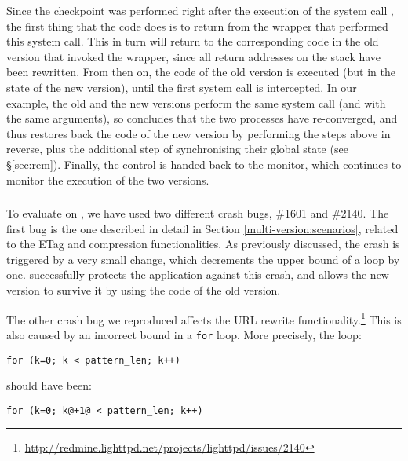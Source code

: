 Since the checkpoint was performed right after the execution of the system
call , the first thing that the code does is to
return from the  wrapper that performed this system
call.  This in turn will return to the corresponding code in the old
version that invoked the wrapper, since all return addresses on the
stack have been rewritten.  From then on, the code of the old version
is executed (but in the state of the new version), until the first
system call is intercepted.  In our example, the old and the new
versions perform the same system call (and with the same arguments),
so \rem concludes that the two processes have re-converged, and thus
restores back the code of the new version by performing the steps
above in reverse, plus the additional step of synchronising their
global state (see \S\ref{sec:rem}).  Finally, the control is handed
back to the \mxm monitor, which continues to monitor the execution of
the two versions.

\subsubsection{\lighttpd}
\label{sec:lighttpd}

To evaluate \mx on \lighttpd, we have used two different crash bugs, \#1601 and
\#2140.  The first bug is the one described in detail in Section
\ref{multi-version:scenarios}, related to the ETag and compression
functionalities.  As previously discussed, the crash is triggered by a very
small change, which decrements the upper bound of a  loop by one.
\mx successfully protects the application against this crash, and allows the
new version to survive it by using the code of the old version.

The other crash bug we reproduced affects the URL rewrite
functionality.\footnote{\url{http://redmine.lighttpd.net/projects/lighttpd/issues/2140}}
This is also caused by an incorrect bound in a \lstinline`for` loop.
More precisely, the loop: 

\begin{lstlisting}[numbers=none,breaklines=true,xleftmargin=0pt]
for (k=0; k < pattern_len; k++)
\end{lstlisting}

\noindent should have been:

\begin{lstlisting}[numbers=none,breaklines=true,xleftmargin=0pt]
for (k=0; k@+1@ < pattern_len; k++)
\end{lstlisting}

